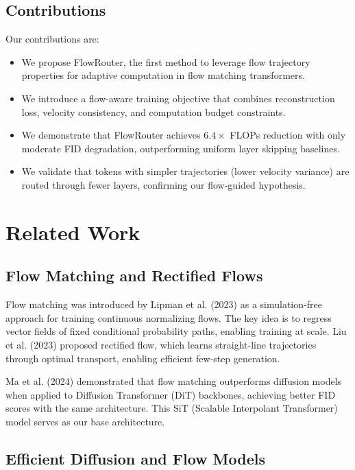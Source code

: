 \documentclass{article}
\begin{document}
\subsection{Contributions}

Our contributions are:
\begin{itemize}
    \item We propose FlowRouter, the first method to leverage flow trajectory properties for adaptive computation in flow matching transformers.
    \item We introduce a flow-aware training objective that combines reconstruction loss, velocity consistency, and computation budget constraints.
    \item We demonstrate that FlowRouter achieves $6.4\times$ FLOPs reduction with only moderate FID degradation, outperforming uniform layer skipping baselines.
    \item We validate that tokens with simpler trajectories (lower velocity variance) are routed through fewer layers, confirming our flow-guided hypothesis.
\end{itemize}

\section{Related Work}
\label{sec:related}

\subsection{Flow Matching and Rectified Flows}

Flow matching was introduced by Lipman et al. (2023) as a simulation-free approach for training continuous normalizing flows. The key idea is to regress vector fields of fixed conditional probability paths, enabling training at scale. Liu et al. (2023) proposed rectified flow, which learns straight-line trajectories through optimal transport, enabling efficient few-step generation.

Ma et al. (2024) demonstrated that flow matching outperforms diffusion models when applied to Diffusion Transformer (DiT) backbones, achieving better FID scores with the same architecture. This SiT (Scalable Interpolant Transformer) model serves as our base architecture.

\subsection{Efficient Diffusion and Flow Models}
\end{document}
